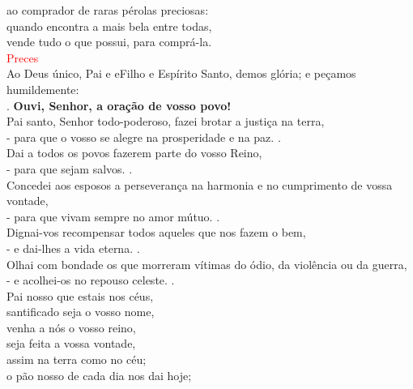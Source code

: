 \documentclass{book}
\begin{document}
\begin{center}
    ao comprador de raras pérolas preciosas: \\
    quando encontra a mais bela entre todas, \\
    vende tudo o que possui, para comprá-la.
    \vspace{.2cm} \\
    \textcolor{red}{Preces}
    \vspace{.2cm} \\
    Ao Deus único, Pai e eFilho e Espírito Santo, demos glória; e peçamos humildemente:
    \vspace{.2cm} \\
    {\color{red} \Rbar.} \textbf{Ouvi, Senhor, a oração de vosso povo!}
    \vspace{.2cm} \\
    Pai santo, Senhor todo-poderoso, fazei brotar a justiça na terra, \\
    - para que o vosso se alegre na prosperidade e na paz. {\color{red} \Rbar.}
    \vspace{.2cm} \\
    Dai a todos os povos fazerem parte do vosso Reino, \\
    - para que sejam salvos. {\color{red} \Rbar.}
    \vspace{.2cm} \\
    Concedei aos esposos a perseverança na harmonia e no cumprimento de vossa vontade, \\
    - para que vivam sempre no amor mútuo. {\color{red} \Rbar.}
    \vspace{.2cm} \\
    Dignai-vos recompensar todos aqueles que nos fazem o bem, \\
    - e dai-lhes a vida eterna. {\color{red} \Rbar.}
    \vspace{.2cm} \\
    Olhai com bondade os que morreram vítimas do ódio, da violência ou da guerra, \\
    - e acolhei-os no repouso celeste. {\color{red} \Rbar.}
    \vspace{.2cm} \\
    Pai nosso que estais nos céus, \\
    santificado seja o vosso nome, \\
    venha a nós o vosso reino, \\
    seja feita a vossa vontade, \\
    assim na terra como no céu; \\
    o pão nosso de cada dia nos dai hoje; \\

\end{center}
\end{document}
